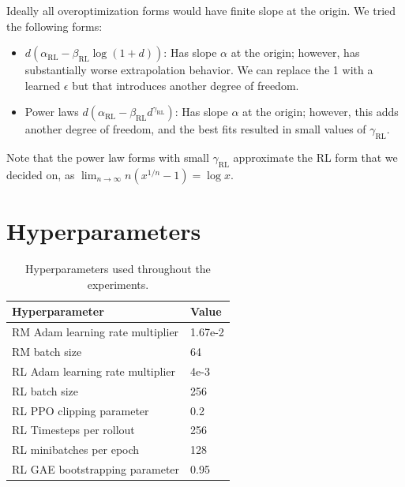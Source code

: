 \documentclass{article}
\theoremstyle{plain}
\begin{document}
Ideally all overoptimization forms would have finite slope at the origin. We tried the following forms:

\begin{itemize}
    \item ${d}\left(\alpha_{\text{RL}}-\beta_{\text{RL}}\log\left({1 + d}\right)\right)$: Has slope $\alpha$ at the origin; however, has substantially worse extrapolation behavior. We can replace the 1 with a learned $\epsilon$ but that introduces another degree of freedom.
    \item Power laws ${d}\left(\alpha_{\text{RL}}-\beta_{\text{RL}}d^{\gamma_{\text{RL}}}\right)$: Has slope $\alpha$ at the origin; however, this adds another degree of freedom, and the best fits resulted in small values of $\gamma_{\text{RL}}$.
\end{itemize}

Note that the power law forms with small $\gamma_{\text{RL}}$ approximate the RL form that we decided on, as $\lim_{n \to \infty} n(x^{1/n} - 1) = \log x$.

\section{Hyperparameters}\label{hparams}



\begin{table}[h]
    \centering
\begin{tabular}{@{}ll@{}}
\toprule
Hyperparameter                   & Value \\ \midrule
RM Adam learning rate multiplier & 1.67e-2  \\
RM batch size                    & 64    \\
RL Adam learning rate multiplier & 4e-3  \\
RL batch size                    & 256   \\
RL PPO clipping parameter        & 0.2   \\
RL Timesteps per rollout         & 256   \\
RL minibatches per epoch         & 128   \\
RL GAE bootstrapping parameter   & 0.95  \\
\bottomrule
\end{tabular}
    \caption{Hyperparameters used throughout the experiments.}
    \label{tab:hparams}
\end{table}

\newpage
\end{document}
